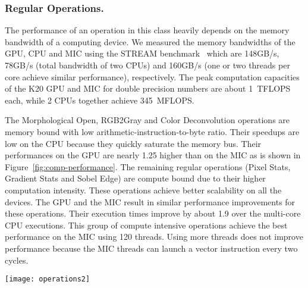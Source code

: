 \subsubsection{{\bf Regular Operations.}}  
The performance of an operation in this class heavily depends on the memory 
bandwidth of a computing device. We measured the memory bandwidths of the 
GPU, CPU and MIC using the STREAM benchmark~\cite{McCalpin1995} which are 
148GB/s, 78GB/s (total bandwidth of two CPUs) and 160GB/s 
(one or two threads per core achieve similar performance), respectively. 
The peak computation capacities of the K20 GPU and MIC for double 
precision numbers are about 1~TFLOPS each, while 2 CPUs together 
achieve 345~MFLOPS.

The Morphological Open, RGB2Gray and Color Deconvolution operations are memory
bound with low arithmetic-instruction-to-byte ratio. Their speedups are low on
the CPU because they quickly saturate the memory bus. Their performances on the 
GPU are nearly 1.25 higher than on the MIC as is shown in 
Figure~\ref{fig:comp-performance}. The remaining 
regular operations (Pixel Stats, Gradient Stats and Sobel Edge) are compute
bound due to their higher computation intensity. These operations achieve
better scalability on all the devices. The GPU and the MIC result in similar 
performance improvements for these operations. Their execution times improve by 
about 1.9 over the multi-core CPU 
executions. This group of compute intensive operations 
achieve the best performance on the MIC using 120 threads. Using more threads 
does not improve performance because the MIC threads can launch a vector instruction 
every two cycles. 
\begin{figure*}[htb!]
\begin{center}
\texttt{[image: operations2]}
\vspace*{-4ex}
\caption{Speedups of the core operations on multi-core CPU, MIC and GPU, 
using the single-core CPU versions as baseline. The number above each dash 
is the number of threads that led to the best performance on the MIC. The
number above the graph in each column is the percent contribution of the 
corresponding operation to the overall application execution time.}
\vspace*{-4ex}
\label{fig:comp-performance}
\end{center}
\end{figure*}
